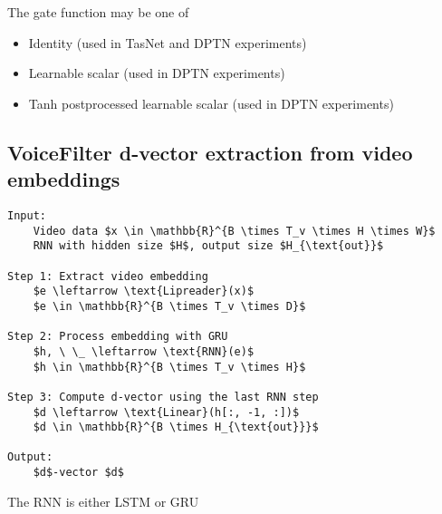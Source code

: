 \documentclass[10pt,conference,compsocconf]{IEEEtran}
\begin{document}
The gate function may be one of 
\begin{itemize}
    \item Identity (used in TasNet and DPTN experiments)
    \item Learnable scalar (used in DPTN experiments)
    \item Tanh postprocessed learnable scalar (used in DPTN experiments)
\end{itemize}

\subsection{VoiceFilter d-vector extraction from video embeddings}\label{sec:vf}
\begin{lstlisting}[mathescape=true]
Input:
    Video data $x \in \mathbb{R}^{B \times T_v \times H \times W}$
    RNN with hidden size $H$, output size $H_{\text{out}}$

Step 1: Extract video embedding
    $e \leftarrow \text{Lipreader}(x)$
    $e \in \mathbb{R}^{B \times T_v \times D}$

Step 2: Process embedding with GRU
    $h, \ \_ \leftarrow \text{RNN}(e)$
    $h \in \mathbb{R}^{B \times T_v \times H}$

Step 3: Compute d-vector using the last RNN step
    $d \leftarrow \text{Linear}(h[:, -1, :])$
    $d \in \mathbb{R}^{B \times H_{\text{out}}}$

Output:
    $d$-vector $d$
\end{lstlisting}
The RNN is either LSTM or GRU
\end{document}
